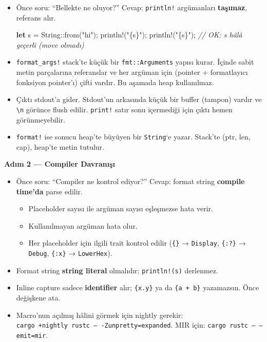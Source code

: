 \documentclass[12pt,a4paper]{article}
\newenvironment{Shaded}{}{}
\newcommand{\CommentTok}[1]{\textcolor[rgb]{0.38,0.63,0.69}{\textit{#1}}}
\newcommand{\DataTypeTok}[1]{\textcolor[rgb]{0.56,0.13,0.00}{#1}}
\newcommand{\FunctionTok}[1]{\textcolor[rgb]{0.02,0.16,0.49}{#1}}
\newcommand{\KeywordTok}[1]{\textcolor[rgb]{0.00,0.44,0.13}{\textbf{#1}}}
\newcommand{\NormalTok}[1]{#1}
\newcommand{\OperatorTok}[1]{\textcolor[rgb]{0.40,0.40,0.40}{#1}}
\newcommand{\StringTok}[1]{\textcolor[rgb]{0.25,0.44,0.63}{#1}}
\begin{document}
\begin{itemize}
\tightlist
\item
  Önce soru: ``Bellekte ne oluyor?'' Cevap: \texttt{println!} argümanları \textbf{taşımaz}, referans alır.

\begin{Shaded}
\begin{Highlighting}[]
\KeywordTok{let}\NormalTok{ s }\OperatorTok{=} \DataTypeTok{String}\OperatorTok{::}\FunctionTok{from}\OperatorTok{(}\StringTok{"hi"}\OperatorTok{);}
\NormalTok{println}\OperatorTok{!(}\StringTok{"\{s\}"}\OperatorTok{);}
\NormalTok{println}\OperatorTok{!(}\StringTok{"\{s\}"}\OperatorTok{);} \CommentTok{// OK: s hâlâ geçerli (move olmadı)}
\end{Highlighting}
\end{Shaded}
\item
  \texttt{format\_args!} stack'te küçük bir \texttt{fmt::Arguments} yapısı kurar. İçinde sabit metin parçalarına referanslar ve her argüman için (pointer + formatlayıcı fonksiyon pointer'ı) çifti vardır. Bu aşamada heap kullanılmaz.
\item
  Çıktı stdout'a gider. Stdout'un arkasında küçük bir buffer (tampon) vardır ve \texttt{\textbackslash{}n} görünce flush edilir. \texttt{print!} satır sonu içermediği için çıktı hemen görünmeyebilir.
\item
  \texttt{format!} ise sonucu heap'te büyüyen bir \texttt{String}`e yazar. Stack'te (ptr, len, cap), heap'te metin tutulur.
\end{itemize}

\textbf{Adım 2 --- Compiler Davranışı}

\begin{itemize}
\tightlist
\item
  Önce soru: ``Compiler ne kontrol ediyor?'' Cevap: format string \textbf{compile time'da} parse edilir.

  \begin{itemize}
  \tightlist
  \item
    Placeholder sayısı ile argüman sayısı eşleşmezse hata verir.
  \item
    Kullanılmayan argüman hata olur.
  \item
    Her placeholder için ilgili trait kontrol edilir (\texttt{\{\}} → \texttt{Display}, \texttt{\{:?\}} → \texttt{Debug}, \texttt{\{:x\}} → \texttt{LowerHex}).
  \end{itemize}
\item
  Format string \textbf{string literal} olmalıdır; \texttt{println!(s)} derlenmez.
\item
  Inline capture sadece \textbf{identifier} alır; \texttt{\{x.y\}} ya da \texttt{\{a\ +\ b\}} yazamazsın. Önce değişkene ata.
\item
  Macro'nun açılmış hâlini görmek için nightly gerekir: \texttt{cargo\ +nightly\ rustc\ --\ -Zunpretty=expanded}. MIR için: \texttt{cargo\ rustc\ --\ --emit=mir}.
\end{itemize}
\end{document}
